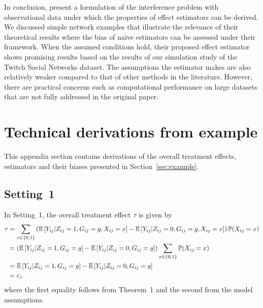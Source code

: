 \documentclass[10pt]{article}
\begin{document}
In conclusion, \textcite{Forastiere:2021} present a formulation of the interference problem with observational data under which the properties of effect estimators can be derived. We discussed simple network examples that illustrate the relevance of their theoretical results where the bias of naive estimators can be assessed under their framework. When the assumed conditions hold, their proposed effect estimator shows promising results based on the results of our simulation study of the Twitch Social Networks dataset. The assumptions the estimator makes are also relatively weaker compared to that of other methods in the literature. However, there are practical concerns such as computational performance on large datasets that are not fully addressed in the original paper.


\newpage


\begin{refcontext}[sorting=nyt]
\printbibliography
\end{refcontext}


\newpage

\appendix



\section{Technical derivations from example} \label{apx:example}

This appendix section contains derivations of the overall treatment effects, estimators and their biases presented in Section~\ref{sec:example}.

\subsection{Setting~1} \label{apx:setting1}

In Setting~1, the overall treatment effect $\tau$ is given by
\begin{align*}
\tau %
&= \sum_{x\in\{0,1\}} \left(\E\left[Y_{ij}|Z_{ij}=1,G_{ij}=g,X_{ij}=x\right] - \E\left[Y_{ij}|Z_{ij}=0,G_{ij}=g,X_{ij}=x\right]\right)\P(X_{ij}=x) \\
&= \left(\E\left[Y_{ij}|Z_{ij}=1,G_{ij}=g\right] - \E\left[Y_{ij}|Z_{ij}=0,G_{ij}=g\right]\right)\sum_{x\in\{0,1\}}\P(X_{ij}=x) \\
&= \E\left[Y_{ij}|Z_{ij}=1,G_{ij}=g\right] - \E\left[Y_{ij}|Z_{ij}=0,G_{ij}=g\right] \\
&= c_z
\end{align*}
where the first equality follows from Theorem~1 and the second from the model assumptions.
\\
\end{document}

